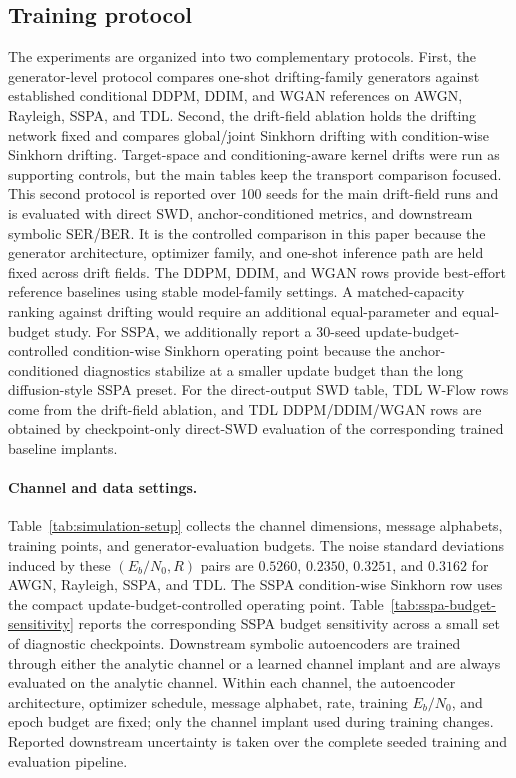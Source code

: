 \documentclass[10pt,journal]{IEEEtran}
\begin{document}
\subsection{Training protocol}
The experiments are organized into two complementary protocols.
First, the generator-level protocol compares one-shot drifting-family generators against established conditional DDPM, DDIM, and WGAN references on AWGN, Rayleigh, SSPA, and TDL.
Second, the drift-field ablation holds the drifting network fixed and compares global/joint Sinkhorn drifting with condition-wise Sinkhorn drifting.
Target-space and conditioning-aware kernel drifts were run as supporting controls, but the main tables keep the transport comparison focused.
This second protocol is reported over 100 seeds for the main drift-field runs and is evaluated with direct SWD, anchor-conditioned metrics, and downstream symbolic SER/BER.
It is the controlled comparison in this paper because the generator architecture, optimizer family, and one-shot inference path are held fixed across drift fields.
The DDPM, DDIM, and WGAN rows provide best-effort reference baselines using stable model-family settings.
A matched-capacity ranking against drifting would require an additional equal-parameter and equal-budget study.
For SSPA, we additionally report a 30-seed update-budget-controlled condition-wise Sinkhorn operating point because the anchor-conditioned diagnostics stabilize at a smaller update budget than the long diffusion-style SSPA preset.
For the direct-output SWD table, TDL W-Flow rows come from the drift-field ablation, and TDL DDPM/DDIM/WGAN rows are obtained by checkpoint-only direct-SWD evaluation of the corresponding trained baseline implants.



\paragraph{Channel and data settings.}
Table~\ref{tab:simulation-setup} collects the channel dimensions, message alphabets, training points, and generator-evaluation budgets.
The noise standard deviations induced by these \((E_b/N_0,R)\) pairs are \(0.5260\), \(0.2350\), \(0.3251\), and \(0.3162\) for AWGN, Rayleigh, SSPA, and TDL.
The SSPA condition-wise Sinkhorn row uses the compact update-budget-controlled operating point.
Table~\ref{tab:sspa-budget-sensitivity} reports the corresponding SSPA budget sensitivity across a small set of diagnostic checkpoints.
Downstream symbolic autoencoders are trained through either the analytic channel or a learned channel implant and are always evaluated on the analytic channel.
Within each channel, the autoencoder architecture, optimizer schedule, message alphabet, rate, training \(E_b/N_0\), and epoch budget are fixed; only the channel implant used during training changes.
Reported downstream uncertainty is taken over the complete seeded training and evaluation pipeline.
\end{document}
